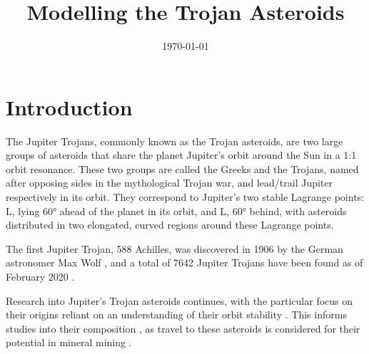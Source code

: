 \documentclass[11pt, a4paper,twocolumn]{article} %
\title{Modelling the Trojan Asteroids}
\author{\authorstyle{Candidate 6952R}
	\institution{University of Cambridge}}
\date{\today} %
\begin{document}
\maketitle %

\thispagestyle{firstpage} %





\section{Introduction}
The Jupiter Trojans, commonly known as the Trojan asteroids, are two large groups of asteroids that share the planet Jupiter's orbit around the Sun in a 1:1 orbit resonance. These two groups are called the Greeks and the Trojans, named after opposing sides in the mythological Trojan war, and lead/trail Jupiter respectively in its orbit. They correspond to Jupiter's two stable Lagrange points: L, lying 60° ahead of the planet in its orbit, and L, 60° behind, with asteroids distributed in two elongated, curved regions around these Lagrange points. 

The first Jupiter Trojan, 588 Achilles, was discovered in 1906 by the German astronomer Max Wolf \cite{Nicholson1961}, and a total of 7642 Jupiter Trojans have been found as of February 2020 \cite{IAU2020}.

Research into Jupiter's Trojan asteroids continues, with the particular focus on their origins reliant on an understanding of their orbit stability \cite{DiSisto2019} \cite{Nesvorn2018}. This informs studies into their composition \cite{Brown2016}, as travel to these asteroids is considered for their potential in mineral mining \cite{Okada2017} \cite{Levison2016}. 
\end{document}
